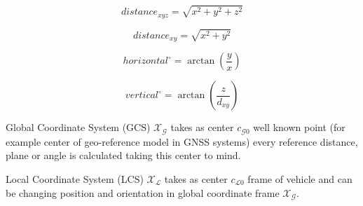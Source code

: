 \begin{equation}\label{eq:cpt05}
    distance_{xyz} = \sqrt{x^2+y^2+z^2}    
\end{equation}

\begin{equation}\label{eq:cpt06}
    distance_{xy} = \sqrt{x^2+y^2}    
\end{equation}

\begin{equation}\label{eq:cpt07}
    horizontal^\circ = \arctan\left(\frac{y}{x}\right)
\end{equation}

\begin{equation}\label{eq:cpt08}
    vertical^\circ =  \arctan \left( \frac{z}{d_{xy}}\right)
\end{equation}

\begin{definition}{Global Coordinate System (GCS) $\mathscr{X}_\mathscr{G}$}\label{def:globalCoordinateSystem}
    takes as center $c_{\mathscr{G}0}$ well known point (for example center of geo-reference model in GNSS systems) every reference distance, plane or angle is calculated taking this center to mind.
\end{definition}

\begin{definition}{Local Coordinate System (LCS) $\mathscr{X}_\mathscr{L}$}\label{def:localCoordinateSystem}
    takes as center $c_{\mathscr{L}0}$ frame of vehicle and can be changing position and orientation in global coordinate frame $\mathscr{X}_\mathscr{G}$.
\end{definition}

